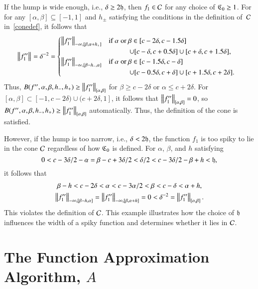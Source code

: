 \documentclass[review]{elsarticle}
\theoremstyle{definition}
\begin{document}
If the hump is wide enough, i.e., $\delta \ge 2 \fh$, then $f_1 \in \cc$ for any
choice of $\fC_0 \ge 1$. For for any $[\alpha,\beta]\subseteq [-1,1]$ and
$h_{\pm}$ satisfying the conditions in the definition of~$\cc$ in~\eqref{conedef},
it follows that
\begin{align*}
    & \norm{f''_1} = \delta^{-2} =
\begin{cases}
\norm[-\infty,{[\beta,\alpha+h_+]}]{f''_1}  %
   & \text{if } \alpha\text{ or } \beta \in [c - 2\delta,  c - 1.5\delta]
\\ & \qquad\quad \cup [c - \delta,  c + 0.5\delta] \cup [c + \delta, c+1.5\delta],
\\ \norm[-\infty,{[\beta - h_-,\alpha]}]{f''_1} %
   & \text{if } \alpha\text{ or } \beta \in [c - 1.5\delta,  c - \delta]
\\ & \qquad\quad  \cup [c - 0.5 \delta,  c + \delta] \cup [c + 1.5\delta, c+2\delta].
\end{cases}
\end{align*}
Thus, $B(f'',\alpha,\beta,h_-,h_+)\ge\norm[{[\alpha,\beta]}]{f''_1}$ for $\beta
\ge c - 2\delta$ or $\alpha \le c + 2\delta$.
For $[\alpha,\beta] \subset [-1,c
- 2\delta) \cup (c+2\delta, 1]$, it follows that $\norm[{[\alpha,\beta]}]{f''_1} =
0$, so $B(f'',\alpha,\beta,h_-,h_+)\ge\norm[{[\alpha,\beta]}]{f''_1}$
automatically. Thus, the definition of the cone is satisfied.

However, if the hump is too narrow, i.e., $\delta < 2 \fh$, the function $f_1$
is too spiky to lie in the cone $\cc$ regardless of how $\fC_0$ is defined. For
$\alpha$, $\beta$, and $h$ satisfying
\[
0 < c - 3\delta/2 -\alpha =  \beta - c+ 3\delta/2 < \delta/2 < c-3\delta/2 - \beta + h < \fh,
\]
it follows that
\begin{gather*}
   \beta -  h < c - 2 \delta < \alpha < c - 3\alpha/2 < \beta < c - \delta < \alpha + h,
\\ \norm[-\infty,{[\beta - h,\alpha]}]{f''_1} =\norm[-\infty,{[\beta,\alpha+h]}]{f''_1}=0
< \delta^{-2} =\norm[{[\alpha,\beta]}]{f''_1}.
\end{gather*}
This violates the definition of $\cc$. This example illustrates how the choice
of $\fh$ influences the width of a spiky function and determines whether it lies in
$\cc$.


\section{The Function Approximation Algorithm, $A$}\label{sec:fappx}
\end{document}
